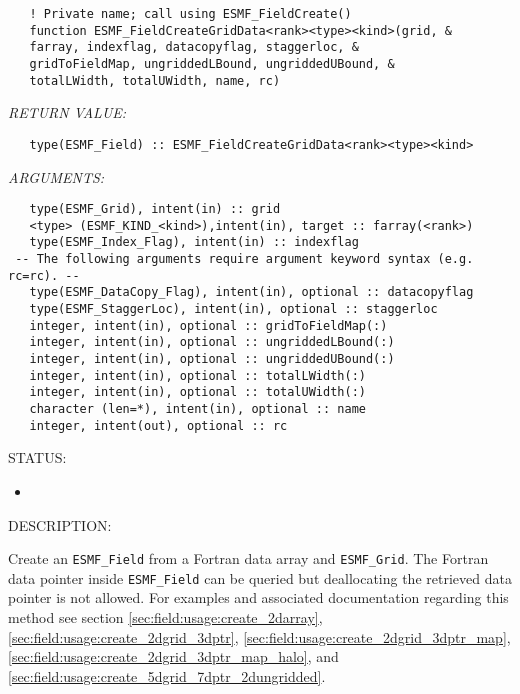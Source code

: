    
\begin{verbatim}   ! Private name; call using ESMF_FieldCreate() 
   function ESMF_FieldCreateGridData<rank><type><kind>(grid, & 
   farray, indexflag, datacopyflag, staggerloc, & 
   gridToFieldMap, ungriddedLBound, ungriddedUBound, & 
   totalLWidth, totalUWidth, name, rc) 
   \end{verbatim}{\em RETURN VALUE:}
\begin{verbatim}   type(ESMF_Field) :: ESMF_FieldCreateGridData<rank><type><kind> 
   \end{verbatim}{\em ARGUMENTS:}
\begin{verbatim}   type(ESMF_Grid), intent(in) :: grid 
   <type> (ESMF_KIND_<kind>),intent(in), target :: farray(<rank>) 
   type(ESMF_Index_Flag), intent(in) :: indexflag 
 -- The following arguments require argument keyword syntax (e.g. rc=rc). --
   type(ESMF_DataCopy_Flag), intent(in), optional :: datacopyflag 
   type(ESMF_StaggerLoc), intent(in), optional :: staggerloc 
   integer, intent(in), optional :: gridToFieldMap(:) 
   integer, intent(in), optional :: ungriddedLBound(:) 
   integer, intent(in), optional :: ungriddedUBound(:) 
   integer, intent(in), optional :: totalLWidth(:) 
   integer, intent(in), optional :: totalUWidth(:) 
   character (len=*), intent(in), optional :: name 
   integer, intent(out), optional :: rc 
   \end{verbatim}
{\sf STATUS:}
   \begin{itemize} 
   \item{} 
   \end{itemize} 
   
{\sf DESCRIPTION:\\ }

 
   Create an {\tt ESMF\_Field} from a Fortran data array and {\tt ESMF\_Grid}. 
   The Fortran data pointer inside {\tt ESMF\_Field} can be queried but deallocating 
   the retrieved data pointer is not allowed. 
   For examples and 
   associated documentation regarding this method see section 
   \ref{sec:field:usage:create_2darray}, 
   \ref{sec:field:usage:create_2dgrid_3dptr}, 
   \ref{sec:field:usage:create_2dgrid_3dptr_map}, 
   \ref{sec:field:usage:create_2dgrid_3dptr_map_halo}, and 
   \ref{sec:field:usage:create_5dgrid_7dptr_2dungridded}. 
   
